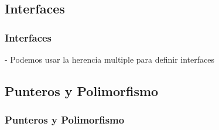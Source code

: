 \documentclass{beamer}
\begin{document}
\subsection{Interfaces}
\begin{frame}
\frametitle{Interfaces}
  - Podemos usar la herencia multiple para definir interfaces
\end{frame}

\subsection{Punteros y Polimorfismo}
\begin{frame}
\frametitle{Punteros y Polimorfismo}
\end{frame}
\end{document}

